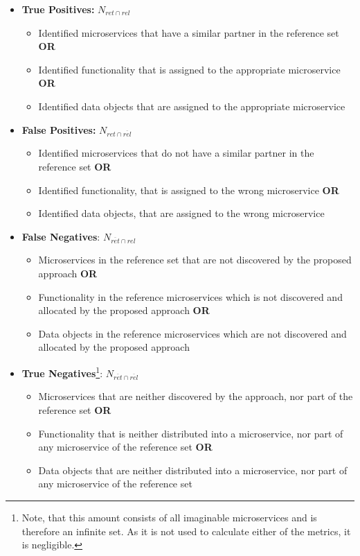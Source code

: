 \begin{itemize}
	\item \textbf{True Positives:}  $N_{ret\cap rel}$  
	
	\begin{itemize}
		\item Identified microservices that have a similar partner in the reference set \textbf{OR}
		\item Identified functionality that is assigned to the appropriate microservice \textbf{OR}
		\item Identified data objects that are assigned to the appropriate microservice
	\end{itemize}
	
	
	\item  \textbf{False Positives:}  $N_{ret\cap \overline{rel}}$ 
	\begin{itemize}
		\item Identified microservices that do not have a similar partner in the reference set \textbf{OR}
		\item Identified functionality, that is assigned to the wrong microservice  \textbf{OR}
		\item Identified data objects, that are assigned to the wrong microservice
	\end{itemize}
	
	\item \textbf{False Negatives}:  $N_{\overline{ret}\cap rel}$ 
		\begin{itemize}
		\item Microservices in the reference set that are not discovered by the proposed approach  \textbf{OR}
		\item Functionality in the reference microservices which is not discovered and allocated by the proposed approach  \textbf{OR}
		\item Data objects in the reference microservices which are not discovered and allocated by the proposed approach
	\end{itemize}
	
	\item \textbf{True Negatives}\footnote{Note, that this amount consists of all imaginable microservices and is therefore an infinite set. As it is not used to calculate either of the metrics, it is negligible. }: $N_{\overline{ret}\cap \overline{rel}}$
	 	\begin{itemize}
	 	\item  Microservices that are neither discovered by the approach, nor part of the reference set   \textbf{OR}
	 	\item Functionality that is neither distributed into a microservice, nor part of any microservice of the reference set  \textbf{OR}
	 	\item Data objects that are neither distributed into a microservice, nor part of any microservice of the reference set
	 \end{itemize}
	
	
	
\end{itemize}


